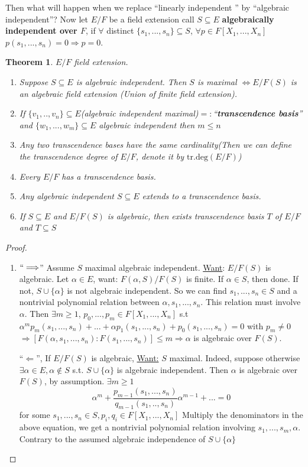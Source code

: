 \documentclass[11pt]{article}
\newtheorem{thm}{Theorem}[section]
\newcommand{\Lrta}{\Longrightarrow}
\newcommand{\Llta}{\Longleftarrow}
\newcommand{\Llrta}{\Longleftrightarrow}
\begin{document}
Then what will happen when we replace ``linearly independent '' by ``algebraic independent''?
Now let $E/F$ be a field extension call $S\subseteq E$ \textbf{algebraically independent over $F$}, if $\forall $ distinct $\{s_1,...,s_n\}\subseteq S$, $\forall p\in F[X_1,...,X_n]$ $p(s_1,...,s_n)=0\Lrta p=0$.

\begin{thm}\label{thm:field_extension}
$E/F$ field extension. 
\begin{enumerate}[label=(\alph*)]
\item Suppose $S\subseteq E$ is algebraic independent. Then $S$ is maximal $\Llrta E/F(S)$ is an algebraic field extension (Union of finite field extension).
\item If $\{v_1,..,v_n\}\subseteq E$(algebraic independent maximal)$=:$``\textbf{transcendence basis}'' and $\{w_1,...,w_m\}\subseteq E$ algebraic independent then $m\leq n$
\item Any two transcendence bases have the same cardinality(Then we can define the transcendence degree of $E/F$, denote it by $\text{tr.deg}(E/F)$)
\item Every $E/F$ has a transcendence basis.
\item Any algebraic independent $S\subseteq E$ extends to a transcendence basis.
\item If $S\subseteq E$ and $E/F(S)$ is algebraic, then exists transcendence basis $T$ of $E/F$ and $T\subseteq S$
\end{enumerate}
\end{thm}
\begin{proof}
\begin{enumerate}[label=(\alph*)]
\item $``\Lrta$'' Assume $S$ maximal algebraic independent. \underline{Want}: $E/F(S)$ is algebraic. Let $\alpha\in E$, want: $F(\alpha,S)/F(S)$ is finite. If $\alpha\in S$, then done. If not, $S\cup \{\alpha\}$ is not algebraic independent. So we can find $s_1,...,s_n\in S$ and a nontrivial polynomial relation between $\alpha,s_1,...,s_n$. This relation must involve $\alpha$. Then $\exists m\geq 1$, $p_0,...,p_m\in F[X_1,...,X_n]$ s.t $\alpha^m p_m(s_1,...,s_n)+...+\alpha p_1(s_1,...,s_n)+p_0(s_1,...,s_n)=0$ with $p_m\neq 0$ $\Lrta [F(\alpha, s_1,...,s_n):F(s_1,...,s_n)]\leq m\Lrta \alpha$ is algebraic over $F(S)$.
 
 ``$\Llta$'', If $E/F(S)$ is algebraic, \underline{Want:} $S$ maximal. Indeed, suppose otherwise $\exists \alpha\in E, \alpha\notin S$ s.t. $S\cup \{\alpha\}$ is algebraic independent. Then $\alpha$ is algebraic over $F(S)$, by assumption. $\exists m\geq 1$
 $$
\alpha^m+\frac{p_{m-1}(s_1,...,s_n)}{q_{m-1}(s_1,..,s_n)}\alpha^{m-1}+...=0
 $$
 for some $s_1,...,s_n\in S, p_i,q_i\in F[X_1,...,X_n]$ Multiply the denominators in the above equation, we get a nontrivial polynomial relation involving $s_1,...,s_m,\alpha$. Contrary to the assumed algebraic independence of $S\cup\{\alpha\}$
\end{enumerate}
\end{proof}
\end{document}
